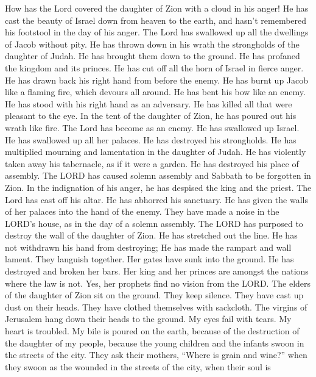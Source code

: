  How has the Lord covered the daughter of Zion with a cloud
in his anger! He has cast the beauty of Israel down from heaven to the
earth, and hasn't remembered his footstool in the day of his anger.
 The Lord has swallowed up all the dwellings of Jacob
without pity. He has thrown down in his wrath the strongholds of the
daughter of Judah. He has brought them down to the ground. He has
profaned the kingdom and its princes.  He has cut off all
the horn of Israel in fierce anger. He has drawn back his right hand
from before the enemy. He has burnt up Jacob like a flaming fire, which
devours all around.  He has bent his bow like an enemy. He
has stood with his right hand as an adversary. He has killed all that
were pleasant to the eye. In the tent of the daughter of Zion, he has
poured out his wrath like fire.  The Lord has become as an
enemy. He has swallowed up Israel. He has swallowed up all her palaces.
He has destroyed his strongholds. He has multiplied mourning and
lamentation in the daughter of Judah.  He has violently
taken away his tabernacle, as if it were a garden. He has destroyed his
place of assembly. The LORD has caused solemn assembly and Sabbath to be
forgotten in Zion. In the indignation of his anger, he has despised the
king and the priest.  The Lord has cast off his altar. He
has abhorred his sanctuary. He has given the walls of her palaces into
the hand of the enemy. They have made a noise in the LORD's house, as in
the day of a solemn assembly.  The LORD has purposed to
destroy the wall of the daughter of Zion. He has stretched out the line.
He has not withdrawn his hand from destroying; He has made the rampart
and wall lament. They languish together.  Her gates have
sunk into the ground. He has destroyed and broken her bars. Her king and
her princes are amongst the nations where the law is not. Yes, her
prophets find no vision from the LORD.  The elders of the
daughter of Zion sit on the ground. They keep silence. They have cast up
dust on their heads. They have clothed themselves with sackcloth. The
virgins of Jerusalem hang down their heads to the ground. 
My eyes fail with tears. My heart is troubled. My bile is poured on the
earth, because of the destruction of the daughter of my people, because
the young children and the infants swoon in the streets of the city.
 They ask their mothers, ``Where is grain and wine?'' when
they swoon as the wounded in the streets of the city, when their soul is
